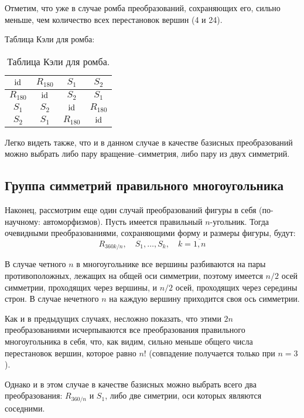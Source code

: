 Отметим, что уже в случае ромба преобразований, сохраняющих его, сильно меньше, чем количество всех перестановок вершин (4 и 24).

Таблица Кэли для ромба:
\begin{table}[htb!]\begin{center}
\begin{tabular}{c|c|c|c|}
$\mathrm{id}$     & $R_{180}$ & $S_1$ & $S_2$ \\
\hline
$R_{180}$ & $\mathrm{id}$     & $S_2$ & $S_1$ \\
\hline
$S_1$     & $S_2$     & $\mathrm{id}$ & $R_{180}$ \\
\hline
$S_2$     & $S_1$     & $R_{180}$ & $\mathrm{id}$ \\
\hline
\end{tabular}
\caption{Таблица Кэли для ромба.}\label{rombus}
\end{center}\end{table}

Легко видеть также, что и в данном случае в качестве базисных преобразований можно выбрать либо пару вращение--симметрия, либо пару из двух симметрий.



\subsection{Группа симметрий правильного многоугольника}

Наконец, рассмотрим еще один случай преобразований фигуры в себя (по-научному: автоморфизмов). Пусть имеется правильный $n$-угольник. Тогда очевидными преобразованиями, сохраняющими форму и размеры фигуры, будут:
$$
R_{360k/n},\quad S_1,\dots, S_k,\quad k=\overline{1,n}
$$

В случае четного $n$ в многоугольнике все вершины разбиваются на пары противоположных, лежащих на общей оси симметрии, поэтому имеется $n/2$ осей симметрии, проходящих через вершины, и $n/2$ осей, проходящих через середины строн. В случае нечетного $n$ на каждую вершину приходится своя ось симметрии.

Как и в предыдущих случаях, несложно показать, что этими $2n$ преобразованиями исчерпываются все преобразования правильного многоугольника в себя, что, как видим, сильно меньше общего числа перестановок вершин, которое равно $n!$ (совпадение получается только при $n=3$).

Однако и в этом случае в качестве базисных можно выбрать всего два преобразования: $R_{360/n}$ и $S_1$, либо две симетрии, оси которых являются соседними.

